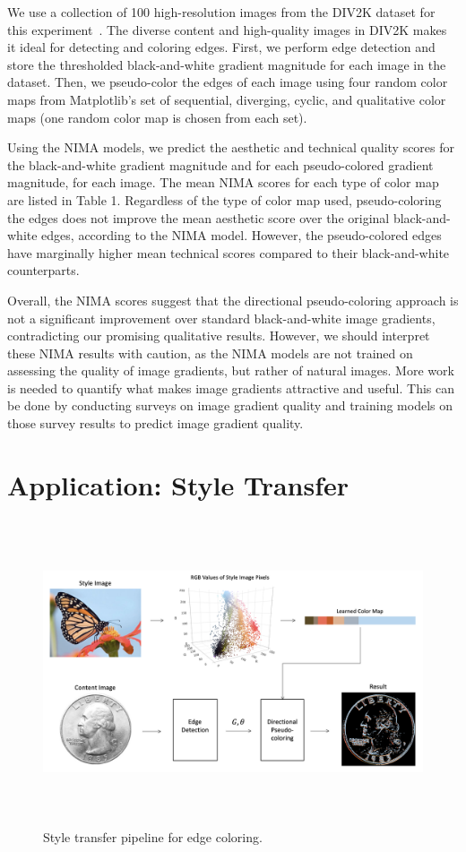 \documentclass{article}
\begin{document}
We use a collection of 100 high-resolution images from the  DIV2K dataset for this experiment~\cite{DIV2K}. The diverse content and high-quality images in DIV2K makes it ideal for detecting and coloring edges. First, we perform edge detection and store the thresholded black-and-white gradient magnitude for each image in the dataset. Then, we pseudo-color the edges of each image using four random color maps from Matplotlib’s set of sequential, diverging, cyclic, and qualitative color maps (one random color map is chosen from each set).

Using the NIMA models, we predict the aesthetic and technical quality scores for the black-and-white gradient magnitude and for each pseudo-colored gradient magnitude, for each image. The mean NIMA scores for each type of color map are listed in Table 1. Regardless of the type of color map used, pseudo-coloring the edges does not improve the mean aesthetic score over the original black-and-white edges, according to the NIMA model. However, the pseudo-colored edges have marginally higher mean technical scores compared to their black-and-white counterparts.

Overall, the NIMA scores suggest that the directional pseudo-coloring approach is not a significant improvement over standard black-and-white image gradients, contradicting our promising qualitative results. However, we should interpret these NIMA results with caution, as the NIMA models are not trained on assessing the quality of image gradients, but rather of natural images. More work is needed to quantify what makes image gradients attractive and useful. This can be done by conducting surveys on image gradient quality and training models on those survey results to predict image gradient quality.

\section{Application: Style Transfer}

\begin{figure}[t]
\centering
\includegraphics[height=9cm]{images/style_transfer_diagram.png}
\caption{Style transfer pipeline for edge coloring.}
\end{figure}
\end{document}
